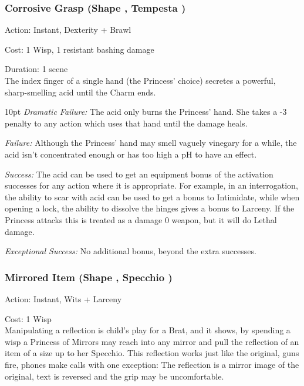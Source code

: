 \subsubsection*{Corrosive Grasp (Shape \textbullet, Tempesta \textbullet)}

\noindent Action: Instant, Dexterity + Brawl

\noindent Cost: 1 Wisp, 1 resistant bashing damage

\noindent Duration: 1 scene \\

\noindent The index finger of a single hand (the Princess' choice) secretes a powerful, sharp-smelling acid until the Charm ends.

\begin{myindentpar}{10pt}    \emph{Dramatic Failure:} The acid only burns the Princess' hand. She takes a -3 penalty to any action which uses that hand until the damage heals.

    \emph{Failure:} Although the Princess' hand may smell vaguely vinegary for a while, the acid isn't concentrated enough or has too high a pH to have an effect.

    \emph{Success:} The acid can be used to get an equipment bonus of the activation successes for any action where it is appropriate. For example, in an interrogation, the ability to scar with acid can be used to get a bonus to Intimidate, while when opening a lock, the ability to dissolve the hinges gives a bonus to Larceny. If the Princess attacks this is treated as a damage 0 weapon, but it will do Lethal damage. 

    \emph{Exceptional Success:} No additional bonus, beyond the extra successes.\end{myindentpar}

\subsubsection*{Mirrored Item (Shape \textbullet, Specchio \textbullet)}

\noindent Action: Instant, Wits + Larceny

\noindent Cost: 1 Wisp \\

Manipulating a reflection is child's play for a Brat, and it shows, by spending a wisp a Princess of Mirrors may reach into any mirror and pull the reflection of an item of a size up to her Specchio. This reflection works just like the original, guns fire, phones make calls with one exception: The reflection is a mirror image of the original, text is reversed and the grip may be uncomfortable.


